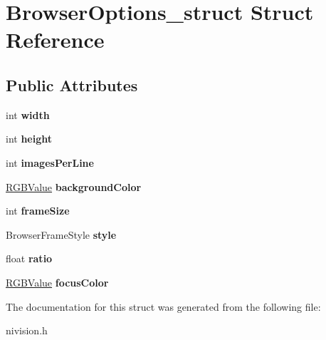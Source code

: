 \hypertarget{structBrowserOptions__struct}{\section{\-Browser\-Options\-\_\-struct \-Struct \-Reference}
\label{structBrowserOptions__struct}
}
\subsection*{\-Public \-Attributes}
\begin{DoxyCompactItemize}
\item 
\hypertarget{structBrowserOptions__struct_a56c706f4999f0ef8f265196bebc1c660}{int {\bfseries width}}\label{structBrowserOptions__struct_a56c706f4999f0ef8f265196bebc1c660}

\item 
\hypertarget{structBrowserOptions__struct_ae85f16490b44c41045f7cb71912f4c9e}{int {\bfseries height}}\label{structBrowserOptions__struct_ae85f16490b44c41045f7cb71912f4c9e}

\item 
\hypertarget{structBrowserOptions__struct_a9441e97e72c5f7a93e699e892bae8e23}{int {\bfseries images\-Per\-Line}}\label{structBrowserOptions__struct_a9441e97e72c5f7a93e699e892bae8e23}

\item 
\hypertarget{structBrowserOptions__struct_aa2f8b2e3e202010802dd125c2eff9be0}{\hyperlink{structRGBValue__struct}{\-R\-G\-B\-Value} {\bfseries background\-Color}}\label{structBrowserOptions__struct_aa2f8b2e3e202010802dd125c2eff9be0}

\item 
\hypertarget{structBrowserOptions__struct_aa26343ec15ea71ff983c13339aeaccf0}{int {\bfseries frame\-Size}}\label{structBrowserOptions__struct_aa26343ec15ea71ff983c13339aeaccf0}

\item 
\hypertarget{structBrowserOptions__struct_a44a1ca96d03c7bfbeaac272322293ea3}{\-Browser\-Frame\-Style {\bfseries style}}\label{structBrowserOptions__struct_a44a1ca96d03c7bfbeaac272322293ea3}

\item 
\hypertarget{structBrowserOptions__struct_a89c1b15549e8b5f7577a63f67c345fe1}{float {\bfseries ratio}}\label{structBrowserOptions__struct_a89c1b15549e8b5f7577a63f67c345fe1}

\item 
\hypertarget{structBrowserOptions__struct_a84b9354e7fa00c044b5c61994030a930}{\hyperlink{structRGBValue__struct}{\-R\-G\-B\-Value} {\bfseries focus\-Color}}\label{structBrowserOptions__struct_a84b9354e7fa00c044b5c61994030a930}

\end{DoxyCompactItemize}


\-The documentation for this struct was generated from the following file\-:\begin{DoxyCompactItemize}
\item 
nivision.\-h\end{DoxyCompactItemize}
